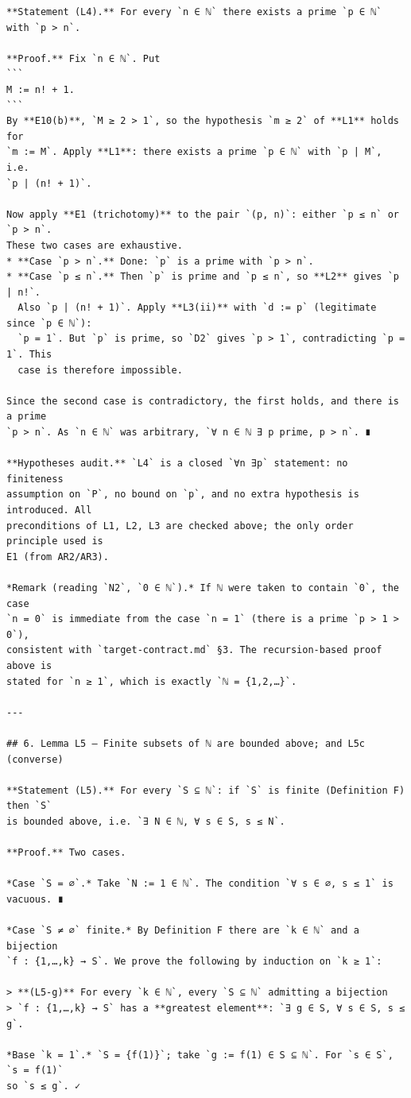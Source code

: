 \documentclass[11pt]{article}
\begin{document}
\begin{verbatim}
**Statement (L4).** For every `n ∈ ℕ` there exists a prime `p ∈ ℕ` with `p > n`.

**Proof.** Fix `n ∈ ℕ`. Put
```
M := n! + 1.
```
By **E10(b)**, `M ≥ 2 > 1`, so the hypothesis `m ≥ 2` of **L1** holds for
`m := M`. Apply **L1**: there exists a prime `p ∈ ℕ` with `p | M`, i.e.
`p | (n! + 1)`.

Now apply **E1 (trichotomy)** to the pair `(p, n)`: either `p ≤ n` or `p > n`.
These two cases are exhaustive.
* **Case `p > n`.** Done: `p` is a prime with `p > n`.
* **Case `p ≤ n`.** Then `p` is prime and `p ≤ n`, so **L2** gives `p | n!`.
  Also `p | (n! + 1)`. Apply **L3(ii)** with `d := p` (legitimate since `p ∈ ℕ`):
  `p = 1`. But `p` is prime, so `D2` gives `p > 1`, contradicting `p = 1`. This
  case is therefore impossible.

Since the second case is contradictory, the first holds, and there is a prime
`p > n`. As `n ∈ ℕ` was arbitrary, `∀ n ∈ ℕ ∃ p prime, p > n`. ∎

**Hypotheses audit.** `L4` is a closed `∀n ∃p` statement: no finiteness
assumption on `P`, no bound on `p`, and no extra hypothesis is introduced. All
preconditions of L1, L2, L3 are checked above; the only order principle used is
E1 (from AR2/AR3).

*Remark (reading `N2`, `0 ∈ ℕ`).* If ℕ were taken to contain `0`, the case
`n = 0` is immediate from the case `n = 1` (there is a prime `p > 1 > 0`),
consistent with `target-contract.md` §3. The recursion-based proof above is
stated for `n ≥ 1`, which is exactly `ℕ = {1,2,…}`.

---

## 6. Lemma L5 — Finite subsets of ℕ are bounded above; and L5c (converse)

**Statement (L5).** For every `S ⊆ ℕ`: if `S` is finite (Definition F) then `S`
is bounded above, i.e. `∃ N ∈ ℕ, ∀ s ∈ S, s ≤ N`.

**Proof.** Two cases.

*Case `S = ∅`.* Take `N := 1 ∈ ℕ`. The condition `∀ s ∈ ∅, s ≤ 1` is vacuous. ∎

*Case `S ≠ ∅` finite.* By Definition F there are `k ∈ ℕ` and a bijection
`f : {1,…,k} → S`. We prove the following by induction on `k ≥ 1`:

> **(L5-g)** For every `k ∈ ℕ`, every `S ⊆ ℕ` admitting a bijection
> `f : {1,…,k} → S` has a **greatest element**: `∃ g ∈ S, ∀ s ∈ S, s ≤ g`.

*Base `k = 1`.* `S = {f(1)}`; take `g := f(1) ∈ S ⊆ ℕ`. For `s ∈ S`, `s = f(1)`
so `s ≤ g`. ✓


\end{verbatim}
\end{document}
